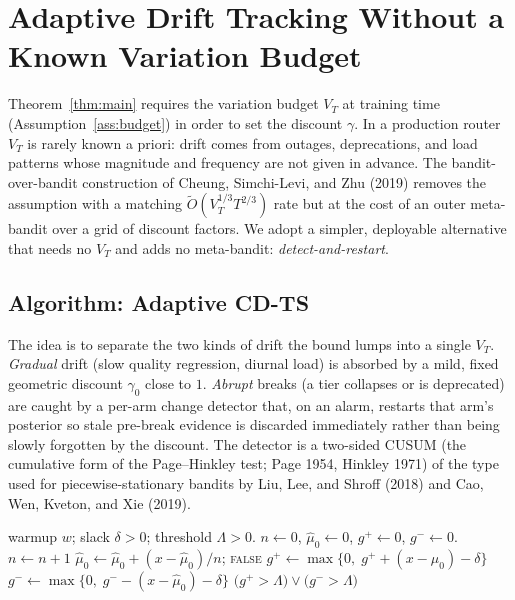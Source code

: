 \documentclass[11pt]{article}
\theoremstyle{definition}
\begin{document}
\section{Adaptive Drift Tracking Without a Known Variation Budget}
\label{sec:adaptive}

Theorem~\ref{thm:main} requires the variation budget $V_T$ at training time
(Assumption~\ref{ass:budget}) in order to set the discount $\gamma$. In a
production router $V_T$ is rarely known a priori: drift comes from outages,
deprecations, and load patterns whose magnitude and frequency are not given in
advance. The bandit-over-bandit construction of Cheung, Simchi-Levi, and Zhu
(2019) removes the assumption with a matching $\widetilde{O}(V_T^{1/3}T^{2/3})$
rate but at the cost of an outer meta-bandit over a grid of discount factors.
We adopt a simpler, deployable alternative that needs no $V_T$ and adds no
meta-bandit: \emph{detect-and-restart}.

\subsection{Algorithm: Adaptive CD-TS}

The idea is to separate the two kinds of drift the bound lumps into a single
$V_T$. \emph{Gradual} drift (slow quality regression, diurnal load) is absorbed
by a mild, fixed geometric discount $\gamma_0$ close to $1$. \emph{Abrupt}
breaks (a tier collapses or is deprecated) are caught by a per-arm change
detector that, on an alarm, restarts that arm's posterior so stale pre-break
evidence is discarded immediately rather than being slowly forgotten by the
discount. The detector is a two-sided CUSUM (the cumulative form of the
Page--Hinkley test; Page 1954, Hinkley 1971) of the type used for
piecewise-stationary bandits by Liu, Lee, and Shroff (2018) and Cao, Wen,
Kveton, and Xie (2019).

\begin{algorithm}[h]
\caption{Two-sided CUSUM change detector (per arm)}
\label{alg:cusum}
\begin{algorithmic}[1]
\Require warmup $w$; slack $\delta > 0$; threshold $\Lambda > 0$.
\State $n \gets 0$, $\hat{\mu}_0 \gets 0$, $g^+ \gets 0$, $g^- \gets 0$.
 
    \State $n \gets n + 1$
     
        \State $\hat{\mu}_0 \gets \hat{\mu}_0 + (x - \hat{\mu}_0)/n$; \quad \Return \textsc{false}
    \EndIf
    \State $g^+ \gets \max\{0,\; g^+ + (x - \hat{\mu}_0) - \delta\}$
    \State $g^- \gets \max\{0,\; g^- - (x - \hat{\mu}_0) - \delta\}$
    \State \Return $\big(g^+ > \Lambda\big) \vee \big(g^- > \Lambda\big)$
\EndFunction
\end{algorithmic}
\end{algorithm}
\end{document}
